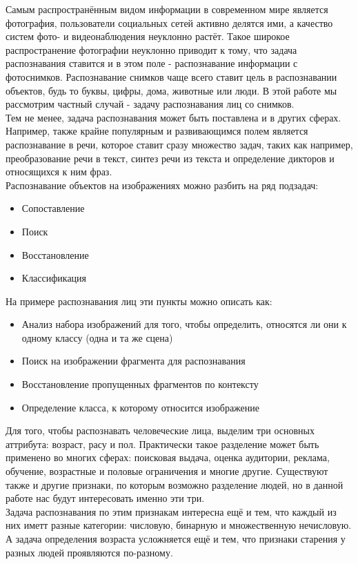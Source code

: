 \documentclass[12pt,a4paper]{article}
\begin{document}
Самым распространённым видом информации в современном мире является фотография, пользователи социальных сетей активно делятся ими, а качество систем фото- и видеонаблюдения неуклонно растёт. Такое широкое распространение фотографии неуклонно приводит к тому, что задача распознавания ставится и в этом поле - распознавание информации с фотоснимков. Распознавание снимков чаще всего ставит цель в распознавании объектов, будь то буквы, цифры, дома, животные или люди. В этой работе мы рассмотрим частный случай - задачу распознавания лиц со снимков. \\
Тем не менее, задача распознавания может быть поставлена и в других сферах. Например, также крайне популярным и развивающимся полем является распознавание в речи, которое ставит сразу множество задач, таких как например, преобразование речи в текст, синтез речи из текста и определение дикторов и относящихся к ним фраз. \\
Распознавание объектов на изображениях можно разбить на ряд подзадач:
\begin{itemize}
    \item Сопоставление
    \item Поиск
    \item Восстановление
    \item Классификация
\end{itemize}
На примере распознавания лиц эти пункты можно описать как:
\begin{itemize}
    \item Анализ набора изображений для того, чтобы определить, относятся ли они к одному классу (одна и та же сцена)
    \item Поиск на изображении фрагмента для распознавания
    \item Восстановление пропущенных фрагментов по контексту
    \item Определение класса, к которому относится изображение
\end{itemize}

Для того, чтобы распознавать человеческие лица, выделим три основных аттрибута: возраст, расу и пол. Практически такое разделение может быть применено во многих сферах: поисковая выдача, оценка аудитории, реклама, обучение, возрастные и половые ограничения и многие другие. Существуют также и другие признаки, по которым возможно разделение людей, но в данной работе нас будут интересовать именно эти три. \\
Задача распознавания по этим признакам интересна ещё и тем, что каждый из них иметт разные категории: числовую, бинарную и множественную нечисловую. А задача определения возраста усложняется ещё и тем, что признаки старения у разных людей проявляются по-разному.
\end{document}
